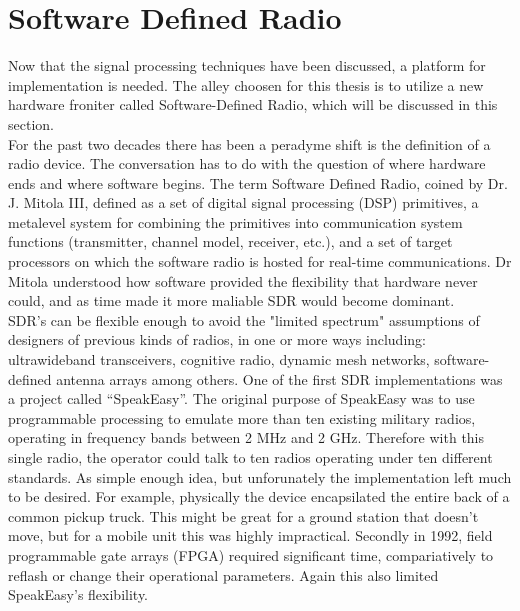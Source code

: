 \section{Software Defined Radio}

Now that the signal processing techniques have been discussed, a platform for implementation is needed.  The alley choosen for this thesis is to utilize a new hardware froniter called Software-Defined Radio, which will be discussed in this section.\\

For the past two decades there has been a peradyme shift is the definition of a radio device.  The conversation has to do with the question of where hardware ends and where software begins.  The term Software Defined Radio, coined by Dr. J. Mitola III,  defined as a set of digital signal processing (DSP) primitives, a metalevel system for combining the primitives into communication system functions (transmitter, channel model, receiver, etc.), and a set of target processors on which the software radio is hosted for real-time communications\cite{21}.  Dr Mitola understood how software provided the flexibility that hardware never could, and as time made it more maliable SDR would become dominant.\\

SDR's can be flexible enough to avoid the "limited spectrum" assumptions of designers of previous kinds of radios, in one or more ways including: ultrawideband transceivers, cognitive radio, dynamic mesh networks, software-defined antenna arrays among others\cite{22}.  One of the first SDR implementations was a project called ``SpeakEasy''.  The original purpose of SpeakEasy was to use programmable processing to emulate more than ten existing military radios, operating in frequency bands between 2 MHz and 2 GHz\cite{23}.  Therefore with this single radio, the operator could talk to ten radios operating under ten different standards.  As simple enough idea, but unforunately the implementation left much to be desired.  For example, physically the device encapsilated the entire back of a common pickup truck\cite{23}.  This might be great for a ground station that doesn't move, but for a mobile unit this was highly impractical.  Secondly in 1992, field programmable gate arrays (FPGA) required significant time, compariatively to reflash or change their operational parameters.  Again this also limited SpeakEasy's flexibility.\\

